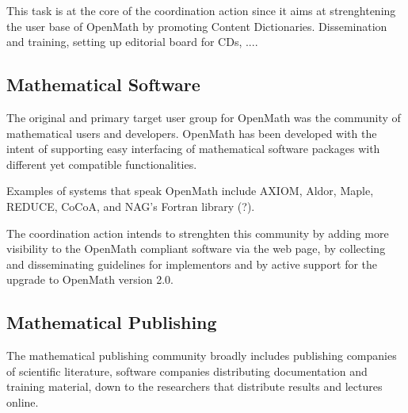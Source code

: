 \documentclass[draft]{artikel3}
\begin{document}
This task is at the core of the coordination action since it aims at
strenghtening the user base of OpenMath by promoting Content
Dictionaries. Dissemination and training, setting up editorial board
for CDs, ....





\subsection{Mathematical Software}
\label{sec:msw}

The original and primary target user group for OpenMath was the
community of mathematical users and developers. OpenMath has been
developed with the intent of supporting easy interfacing of
mathematical software packages with different yet compatible
functionalities. 

Examples of systems that speak OpenMath include AXIOM, Aldor, Maple,
REDUCE, CoCoA, and NAG's Fortran library (?).

The coordination action intends to strenghten this community by adding
more visibility to the OpenMath compliant software via the web page,
by collecting and disseminating guidelines for implementors and by
active support for the upgrade to OpenMath version 2.0.

\subsection{Mathematical Publishing}
\label{sec:mpubl}

The mathematical publishing community broadly includes publishing
companies of scientific literature, software companies distributing
documentation and training material, down to the researchers that
distribute results and lectures online.
\end{document}
